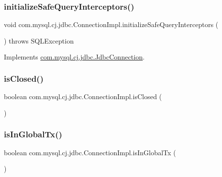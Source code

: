 \subsubsection{\texorpdfstring{initialize\+Safe\+Query\+Interceptors()}{initializeSafeQueryInterceptors()}}
{\footnotesize\ttfamily void com.\+mysql.\+cj.\+jdbc.\+Connection\+Impl.\+initialize\+Safe\+Query\+Interceptors (\begin{DoxyParamCaption}{ }\end{DoxyParamCaption}) throws S\+Q\+L\+Exception}



Implements \mbox{\hyperlink{interfacecom_1_1mysql_1_1cj_1_1jdbc_1_1_jdbc_connection_a48b2a3226fefc00bf09985a66da96d90}{com.\+mysql.\+cj.\+jdbc.\+Jdbc\+Connection}}.

\mbox{\label{classcom_1_1mysql_1_1cj_1_1jdbc_1_1_connection_impl_a4d32ea019819ff99edce873df7e4aa35}} 
\subsubsection{\texorpdfstring{is\+Closed()}{isClosed()}}
{\footnotesize\ttfamily boolean com.\+mysql.\+cj.\+jdbc.\+Connection\+Impl.\+is\+Closed (\begin{DoxyParamCaption}{ }\end{DoxyParamCaption})}

\mbox{\label{classcom_1_1mysql_1_1cj_1_1jdbc_1_1_connection_impl_a36d32f1c890a8774776f435a8d7a9f55}} 
\subsubsection{\texorpdfstring{is\+In\+Global\+Tx()}{isInGlobalTx()}}
{\footnotesize\ttfamily boolean com.\+mysql.\+cj.\+jdbc.\+Connection\+Impl.\+is\+In\+Global\+Tx (\begin{DoxyParamCaption}{ }\end{DoxyParamCaption})}

